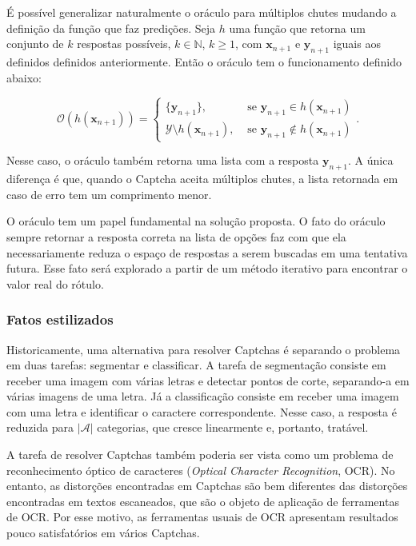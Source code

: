\documentclass[12pt,twoside,brazilian]{book}
\begin{document}
É possível generalizar naturalmente o oráculo para múltiplos chutes
mudando a definição da função que faz predições. Seja \(h\) uma função
que retorna um conjunto de \(k\) respostas possíveis,
\(k\in \mathbb N\), \(k\geq 1\), com \(\mathbf x_{n+1}\) e
\(\mathbf y_{n+1}\) iguais aos definidos definidos anteriormente. Então
o oráculo tem o funcionamento definido abaixo:

\[
\mathcal O(h(\mathbf x_{n+1})) = \left\{\begin{array}{ll}
    \{\mathbf y_{n+1}\}, & \text{ se } \mathbf y_{n+1} \in h(\mathbf x_{n+1})  \\
   \mathcal Y \setminus h(\mathbf x_{n+1}), & \text{ se } \mathbf y_{n+1} \notin h(\mathbf x_{n+1})
\end{array}\right..
\]

Nesse caso, o oráculo também retorna uma lista com a resposta
\(\mathbf y_{n+1}\). A única diferença é que, quando o Captcha aceita
múltiplos chutes, a lista retornada em caso de erro tem um comprimento
menor.

O oráculo tem um papel fundamental na solução proposta. O fato do
oráculo sempre retornar a resposta correta na lista de opções faz com
que ela necessariamente reduza o espaço de respostas a serem buscadas em
uma tentativa futura. Esse fato será explorado a partir de um método
iterativo para encontrar o valor real do rótulo.

\hypertarget{fatos-estilizados}{%
\subsubsection{Fatos estilizados}\label{fatos-estilizados}}

Historicamente, uma alternativa para resolver Captchas é separando o
problema em duas tarefas: segmentar e classificar. A tarefa de
segmentação consiste em receber uma imagem com várias letras e detectar
pontos de corte, separando-a em várias imagens de uma letra. Já a
classificação consiste em receber uma imagem com uma letra e identificar
o caractere correspondente. Nesse caso, a resposta é reduzida para
\(|\mathcal A|\) categorias, que cresce linearmente e, portanto,
tratável.

A tarefa de resolver Captchas também poderia ser vista como um problema
de reconhecimento óptico de caracteres (\emph{Optical Character
Recognition}, OCR). No entanto, as distorções encontradas em Captchas
são bem diferentes das distorções encontradas em textos escaneados, que
são o objeto de aplicação de ferramentas de OCR. Por esse motivo, as
ferramentas usuais de OCR apresentam resultados pouco satisfatórios em
vários Captchas.
\end{document}
